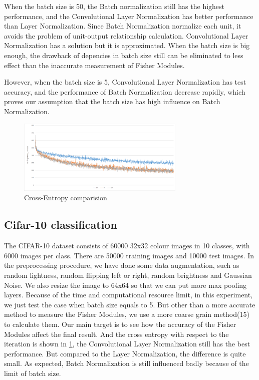 \documentclass{sig-alternate}
\begin{document}
    When the batch size is 50, the Batch normalization still has the highest performance, and the Convolutional Layer Normalization has better performance than Layer Normalization. Since Batch Normalization normalize each unit, it avoids the problem of unit-output relationship calculation. Convolutional Layer Normalization has a solution but it is approximated. When the batch size is big enough, the drawback of depencies in batch size still can be eliminated to less effect than the inaccurate measurement of Fisher Modules. 
    
    However, when the batch size is 5, Convolutional Layer Normalization has test accuracy, and the performance of Batch Normalization decrease rapidly, which proves our assumption that the batch size has high influence on Batch Normalization.


    \begin{figure}[t!]
        \centering
        \centerline{\includegraphics[width=8cm]{loss_clfar}}
        \caption{Cross-Entropy comparision}
        \label{fig:loss_clfar}
    \end{figure}
    
    \subsection{Cifar-10 classification}
    The CIFAR-10 dataset consists of 60000 32x32 colour images in 10 classes, with 6000 images per class. There are 50000 training images and 10000 test images.
    In the preprocessing procedure, we have done some data augmentation, such as random lightness, random flipping left or right, random brightness and Gaussian Noise. We also resize the image to 64x64 so that we can put more max pooling layers. Because of the time and computational resource limit, in this experiment, we just test the case when batch size equals to 5. But other than a more accurate method to measure the Fisher Modules, we use a more coarse grain method(15) to calculate them. Our main target is to see how the accuracy of the Fisher Modules affect the final result. And the cross entropy with respect to the iteration is shown in \ref{fig:loss_clfar}, the Convolutional Layer Normalization still has the best performance. But compared to the Layer Normalization, the difference is quite small. As expected, Batch Normalization is still influenced badly because of the limit of batch size. 
\end{document}
